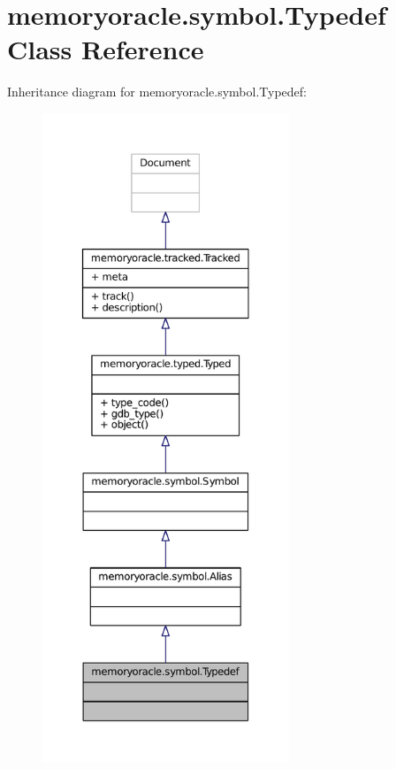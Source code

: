 \hypertarget{classmemoryoracle_1_1symbol_1_1Typedef}{}\section{memoryoracle.\+symbol.\+Typedef Class Reference}
\label{classmemoryoracle_1_1symbol_1_1Typedef}


Inheritance diagram for memoryoracle.\+symbol.\+Typedef\+:
\nopagebreak
\begin{figure}[H]
\begin{center}
\leavevmode
\includegraphics[height=550pt]{classmemoryoracle_1_1symbol_1_1Typedef__inherit__graph}
\end{center}
\end{figure}


